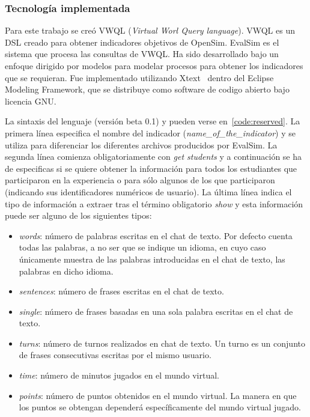 \subsubsection{Tecnología implementada}

Para este trabajo se creó VWQL (\emph{Virtual Worl Query language}). VWQL es un DSL creado para obtener indicadores objetivos de OpenSim. EvalSim es el sistema que procesa las consultas de VWQL. Ha sido desarrollado bajo un enfoque dirigido por modelos para modelar procesos para obtener los indicadores que se requieran. Fue implementado utilizando Xtext~\cite{eysholdt2010xtext} dentro del Eclipse Modeling Framework, que se distribuye como software de codigo abierto bajo licencia GNU.

La sintaxis del lenguaje (versión beta 0.1) y pueden verse en~\ref{code:reserved}. La primera línea especifica el nombre del indicador (\emph{name\_of\_the\_indicator}) y se utiliza para diferenciar los diferentes archivos producidos por EvalSim. La segunda línea comienza obligatoriamente con \emph{get students} y a continuación se ha de especificas si se quiere obtener la información para todos los estudiantes que participaron en la experiencia o para sólo algunos de los que participaron (indicando sus identificadores numéricos de usuario). La última línea indica el tipo de información a extraer tras el término obligatorio \emph{show} y esta información puede ser alguno de los siguientes tipos:

\begin{itemize}
\item \emph{words}: número de palabras escritas en el chat de texto. Por defecto cuenta todas las palabras, a no ser que se indique un idioma, en cuyo caso únicamente muestra de las palabras introducidas en el chat de texto, las palabras en dicho idioma.
\item \emph{sentences}: número de frases escritas en el chat de texto.
\item \emph{single}: número de frases basadas en una sola palabra escritas en el chat de texto.
\item \emph{turns}: número de turnos realizados en chat de texto. Un turno es un conjunto de frases consecutivas escritas por el mismo usuario.
\item \emph{time}: número de minutos jugados en el mundo virtual.
\item \emph{points}: número de puntos obtenidos en el mundo virtual. La manera en que los puntos se obtengan dependerá específicamente del mundo virtual jugado.
\end{itemize}

